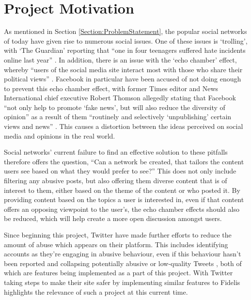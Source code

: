 \section{Project Motivation}
As mentioned in Section \ref{Section:ProblemStatement}, the popular social networks of today have given rise to numerous social issues. One of these issues is `trolling', with `The Guardian' reporting that ``one in four teenagers suffered hate incidents online last year'' \cite{Gani:Trolling}. In addition, there is an issue with the `echo chamber' effect, whereby ``users of the social media site interact most with those who share their political views'' \cite{Jackson:EchoChamber}. Facebook in particular have been accused of not doing enough to prevent this echo chamber effect, with former Times editor and News International chief executive Robert Thomson allegedly stating that Facebook ``not only help to promote `fake news', but will also reduce the diversity of opinion'' as a result of them ``routinely and selectively `unpublishing' certain views and news'' \cite{Orlowski:EchoChamber}. This causes a distortion between the ideas perceived on social media and opinions in the real world.

Social networks' current failure to find an effective solution to these pitfalls therefore offers the question, ``Can a network be created, that tailors the content users see based on what they would prefer to see?'' This does not only include filtering any abusive posts, but also offering them diverse content that is of interest to them, either based on the theme of the content or who posted it. By providing content based on the topics a user is interested in, even if that content offers an opposing viewpoint to the user's, the echo chamber effects should also be reduced, which will help create a more open discussion amongst users.

Since beginning this project, Twitter have made further efforts to reduce the amount of abuse which appears on their platform. This includes identifying accounts as they’re engaging in abusive behaviour, even if this behaviour hasn’t been reported and collapsing potentially abusive or low-quality Tweets \cite{Twitter:Safety}, both of which are features being implemented as a part of this project. With Twitter taking steps to make their site safer by implementing similar features to Fidelis highlights the relevance of such a project at this current time.

